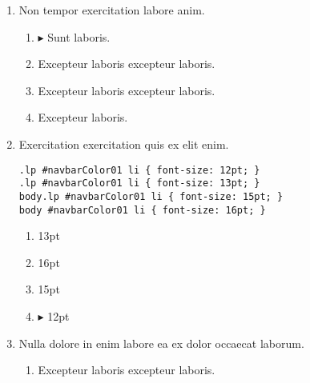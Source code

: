 \documentclass[a4paper,12pt]{article}
\begin{document}
\begin{enumerate}[label=\textbf{\arabic*.}]
\begin{multicols}{2}
\begin{enumerate}
	\end{enumerate}

\end{multicols}
\item Non tempor exercitation labore anim.
\begin{multicols}{2}
	\begin{enumerate}
		\item $\blacktriangleright$  Sunt laboris.
    
		\item  Excepteur laboris excepteur laboris.
  
		\item  Excepteur laboris excepteur laboris.
    
		\item  Excepteur laboris.
    
	\end{enumerate}

\end{multicols}
\item Exercitation exercitation quis ex elit enim.
  
  \begin{minipage}{\textwidth} %
  \begin{lstlisting}
.lp #navbarColor01 li { font-size: 12pt; }
.lp #navbarColor01 li { font-size: 13pt; }
body.lp #navbarColor01 li { font-size: 15pt; }
body #navbarColor01 li { font-size: 16pt; }
  \end{lstlisting}
  \end{minipage}
\begin{multicols}{2}
	\begin{enumerate}
		\item  13pt
    
		\item  16pt
  
		\item  15pt
    
		\item $\blacktriangleright$  12pt
    
	\end{enumerate}

\end{multicols}
\item Nulla dolore in enim labore ea ex dolor occaecat laborum.
\begin{multicols}{2}
	\begin{enumerate}
		\item  Excepteur laboris excepteur laboris.
    

\end{enumerate}
\end{multicols}
\end{enumerate}
\end{document}
